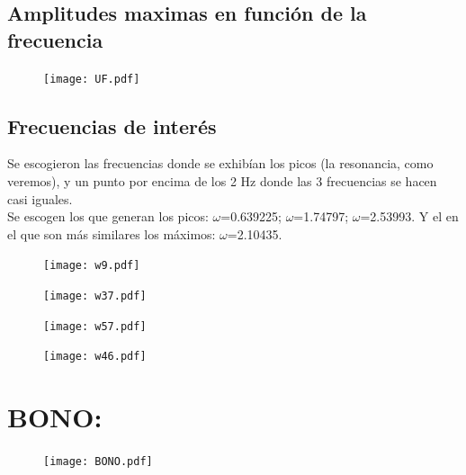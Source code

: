 \documentclass[11pt,letterpaper]{exam}
\begin{document}
\subsection{Amplitudes maximas en función de la frecuencia}
\begin{figure}[H]
\centering
\texttt{[image: UF.pdf]}
\end{figure}

\subsection{Frecuencias de interés}
Se escogieron las frecuencias donde se exhibían los picos (la resonancia, como veremos), y un punto por encima de los 2 Hz donde las 3 frecuencias se hacen casi iguales.\\
Se escogen los que generan los picos: $\omega$=0.639225; $\omega$=1.74797;  $\omega$=2.53993. Y el en el que son más similares los máximos: $\omega$=2.10435.
\begin{figure}[H]
\centering
\texttt{[image: w9.pdf]}
\end{figure}

\begin{figure}[H]
\centering
\texttt{[image: w37.pdf]}
\end{figure}

\begin{figure}[H]
\centering
\texttt{[image: w57.pdf]}
\end{figure}

\begin{figure}[H]
\centering
\texttt{[image: w46.pdf]}
\end{figure}

\section{BONO:}
\begin{figure}[H]
\centering
\texttt{[image: BONO.pdf]}
\end{figure}
\end{document}
